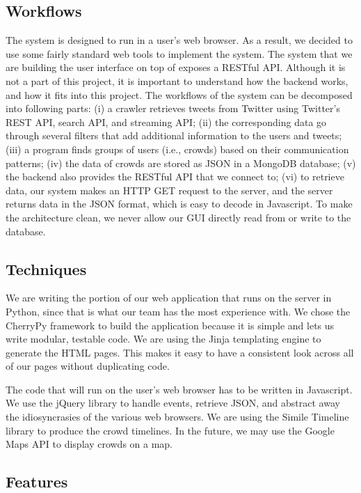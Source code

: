 \documentclass{sig-alternate}
\begin{document}
\subsection{Workflows}

The system is designed to run in a user's web browser. As a result, we decided
to use some fairly standard web tools to implement the system. The system that
we are building the user interface on top of exposes a RESTful API. Although
it is not a part of this project, it is important to understand how the backend
works, and how it fits into this project. The workflows of the system can be
decomposed into following parts: (i) a crawler retrieves tweets from Twitter using
Twitter's REST API, search API, and streaming API; (ii) the corresponding data
go through several filters that add additional information to the users and
tweets; (iii) a program finds groups of users (i.e., crowds) based on their 
communication patterns; (iv) the data of crowds are stored as JSON in a MongoDB
database; (v) the backend also provides the RESTful API that we connect to; (vi)
to retrieve data, our system makes an HTTP GET request to the server, and the 
server returns data in the JSON format, which is easy to decode in Javascript.
To make the architecture clean, we never allow our GUI directly read from or 
write to the database.

\subsection{Techniques}

We are writing the portion of our web application that runs on the server in
Python, since that is what our team has the most experience with. We chose the
CherryPy framework to build the application because it is simple and lets us
write modular, testable code. We are using the Jinja templating engine to
generate the HTML pages. This makes it easy to have a consistent look across
all of our pages without duplicating code.

The code that will run on the user's web browser has to be written in
Javascript. We use the jQuery library to handle events, retrieve JSON, and
abstract away the idiosyncrasies of the various web browsers. We are using the
Simile Timeline library \cite{simile} to produce the crowd timelines. In the 
future, we may use the Google Maps API to display crowds on a map.

\subsection{Features}
\end{document}
